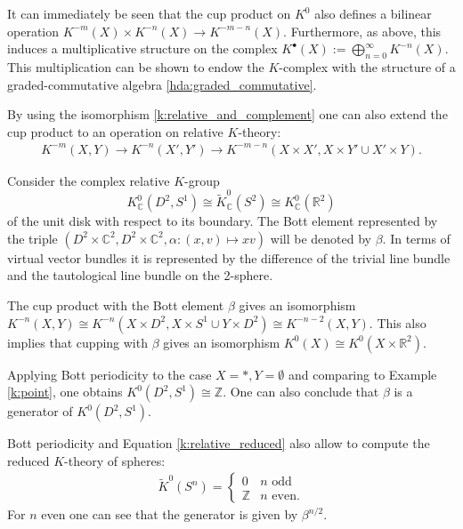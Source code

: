 {    \begin{property}
        It can immediately be seen that the cup product on $K^0$ also defines a bilinear operation $K^{-m}(X)\times K^{-n}(X)\rightarrow K^{-m-n}(X)$. Furthermore, as above, this induces a multiplicative structure on the complex $K^\bullet(X):=\bigoplus_{n=0}^\infty K^{-n}(X)$. This multiplication can be shown to endow the $K$-complex with the structure of a graded-commutative algebra \ref{hda:graded_commutative}.

        By using the isomorphism \eqref{k:relative_and_complement} one can also extend the cup product to an operation on relative $K$-theory:
        \begin{gather}
            K^{-m}(X,Y)\rightarrow K^{-n}(X',Y')\rightarrow K^{-m-n}(X\times X',X\times Y'\cup X'\times Y).
        \end{gather}
    \end{property}

    \begin{notation}
        Consider the complex relative $K$-group \[K^0_\mathbb{C}(D^2,S^1)\cong\widetilde{K}^0_\mathbb{C}(S^2)\cong K^0_\mathbb{C}(\mathbb{R}^2)\] of the unit disk with respect to its boundary. The Bott element represented by the triple $\left(D^2\times\mathbb{C}^2,D^2\times\mathbb{C}^2,\alpha:(x,v)\mapsto xv\right)$ will be denoted by $\beta$. In terms of virtual vector bundles it is represented by the difference of the trivial line bundle and the tautological line bundle on the 2-sphere.
    \end{notation}
    \begin{theorem}
        The cup product with the Bott element $\beta$ gives an isomorphism $K^{-n}(X,Y)\cong K^{-n}(X\times D^2,X\times S^1\cup Y\times D^2)\cong K^{-n-2}(X,Y)$. This also implies that cupping with $\beta$ gives an isomorphism $K^0(X)\cong K^0(X\times\mathbb{R}^2)$.
    \end{theorem}
    \begin{result}
        Applying Bott periodicity to the case $X=\ast,Y=\emptyset$ and comparing to Example \ref{k:point}, one obtains $K^0(D^2,S^1)\cong\mathbb{Z}$. One can also conclude that $\beta$ is a generator of $K^0(D^2,S^1)$.
    \end{result}
    \begin{result}[Spheres]
        Bott periodicity and Equation \eqref{k:relative_reduced} also allow to compute the reduced $K$-theory of spheres:
        \begin{gather}
            \widetilde{K}^0(S^n) =
            \begin{cases}
                0&n\text{ odd}\\
                \mathbb{Z}&n\text{ even}.
            \end{cases}
        \end{gather}
        For $n$ even one can see that the generator is given by $\beta^{n/2}$.
    \end{result}

}

